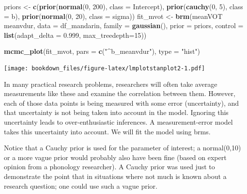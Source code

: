 \documentclass[12pt,]{krantz}
\newenvironment{Shaded}{\begin{snugshade}}{\end{snugshade}}
\newcommand{\DataTypeTok}[1]{\textcolor[rgb]{0.13,0.29,0.53}{#1}}
\newcommand{\DecValTok}[1]{\textcolor[rgb]{0.00,0.00,0.81}{#1}}
\newcommand{\FloatTok}[1]{\textcolor[rgb]{0.00,0.00,0.81}{#1}}
\newcommand{\KeywordTok}[1]{\textcolor[rgb]{0.13,0.29,0.53}{\textbf{#1}}}
\newcommand{\NormalTok}[1]{#1}
\newcommand{\OperatorTok}[1]{\textcolor[rgb]{0.81,0.36,0.00}{\textbf{#1}}}
\newcommand{\StringTok}[1]{\textcolor[rgb]{0.31,0.60,0.02}{#1}}
\theoremstyle{definition}
\theoremstyle{definition}
\theoremstyle{definition}
\theoremstyle{remark}
\begin{document}
\begin{Shaded}
\begin{Highlighting}[]
\NormalTok{priors <-}\StringTok{ }\KeywordTok{c}\NormalTok{(}\KeywordTok{prior}\NormalTok{(}\KeywordTok{normal}\NormalTok{(}\DecValTok{0}\NormalTok{, }\DecValTok{200}\NormalTok{), }\DataTypeTok{class =}\NormalTok{ Intercept),}
            \KeywordTok{prior}\NormalTok{(}\KeywordTok{cauchy}\NormalTok{(}\DecValTok{0}\NormalTok{, }\DecValTok{5}\NormalTok{), }\DataTypeTok{class =}\NormalTok{ b),}
            \KeywordTok{prior}\NormalTok{(}\KeywordTok{normal}\NormalTok{(}\DecValTok{0}\NormalTok{, }\DecValTok{20}\NormalTok{), }\DataTypeTok{class =}\NormalTok{ sigma))}
\NormalTok{fit_mvot <-}\StringTok{ }\KeywordTok{brm}\NormalTok{(meanVOT }\OperatorTok{~}\StringTok{ }\NormalTok{meanvdur,}
                \DataTypeTok{data =}\NormalTok{ df_mandarin, }
                \DataTypeTok{family =} \KeywordTok{gaussian}\NormalTok{(), }
                \DataTypeTok{prior =}\NormalTok{ priors,}
                \DataTypeTok{control =} \KeywordTok{list}\NormalTok{(}\DataTypeTok{adapt_delta =} \FloatTok{0.999}\NormalTok{,}
                               \DataTypeTok{max_treedepth=}\DecValTok{15}\NormalTok{))}
\end{Highlighting}
\end{Shaded}

\begin{Shaded}
\begin{Highlighting}[]
\KeywordTok{mcmc_plot}\NormalTok{(fit_mvot, }\DataTypeTok{pars =} \KeywordTok{c}\NormalTok{(}\StringTok{"^b_meanvdur"}\NormalTok{), }\DataTypeTok{type =} \StringTok{"hist"}\NormalTok{)}
\end{Highlighting}
\end{Shaded}

\texttt{[image: bookdown\_files/figure-latex/lmplotstanplot2-1.pdf]}

In many practical research problems, researchers will often take average measurements like these and examine the correlation between them. However, each of those data points is being measured with some error (uncertainty), and that uncertainty is not being taken into account in the model. Ignoring this uncertainty leads to over-enthusiastic inferences. A measurement-error model takes this uncertainty into account. We will fit the model using brms.

Notice that a Cauchy prior is used for the parameter of interest; a normal(0,10) or a more vague prior would probably also have been fine (based on expert opinion from a phonology researcher). A Cauchy prior was used just to demonstrate the point that in situations where not much is known about a research question; one could use such a vague prior.
\end{document}
